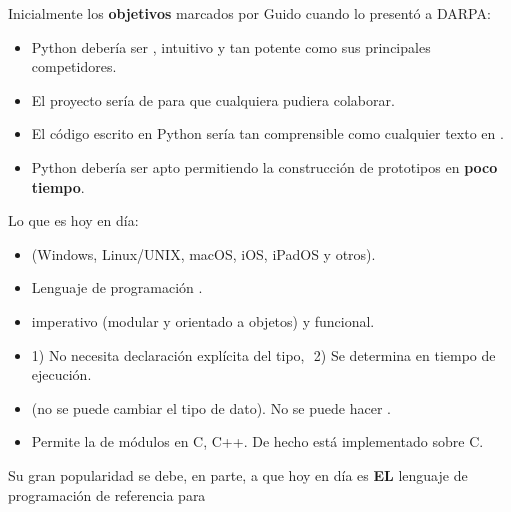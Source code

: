 \noindent Inicialmente los \textbf{objetivos} marcados por Guido cuando lo presentó a DARPA:
\begin{itemize}
\item Python debería ser , intuitivo y tan potente como sus principales competidores.
\item El proyecto sería de  para que cualquiera pudiera colaborar.
\item El código escrito en Python sería tan comprensible como cualquier texto en .
\item Python debería ser apto  permitiendo la construcción de prototipos en \textbf{poco tiempo}.
\end{itemize}

\noindent Lo que es hoy en día:

\begin{itemize}
\item {} (Windows, Linux/UNIX, macOS,  iOS, iPadOS y otros).
\item Lenguaje de programación .
\item {} imperativo (modular y orientado a objetos) y funcional.
\item {} {\small 1) No necesita declaración explícita del tipo, 
$ $\phantom{Dinámico: }  2) Se determina en tiempo de ejecución.}
\item {} (no se puede cambiar el tipo de dato). 
No se puede hacer .
\item Permite la  de módulos en C, C++.
De hecho está implementado sobre C.
\end{itemize}




\noindent 
 Su gran popularidad se debe, en parte, a que hoy en día es \textbf{EL} lenguaje de programación de referencia para 


